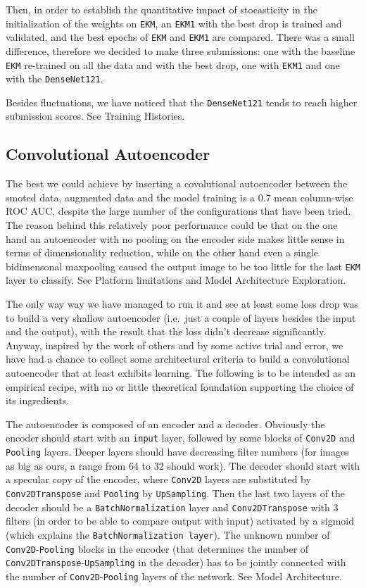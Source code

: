 \documentclass[aps,twocolumn,secnumarabic,nobalancelastpage,amsmath,amssymb,
nofootinbib]{revtex4}
\begin{document}
Then, in order to establish the quantitative impact of stocasticity in
the initialization of the weights on \texttt{EKM}, an \texttt{EKM1} with
the best drop is trained and validated, and the best epochs of
\texttt{EKM} and \texttt{EKM1} are compared. There was a small
difference, therefore we decided to make three submissions: one with the
baseline \texttt{EKM} re-trained on all the data and with the best drop,
one with \texttt{EKM1} and one with the \texttt{DenseNet121}.

Besides fluctuations, we have noticed that the \texttt{DenseNet121}
tends to reach higher submission scores. See
Training Histories.

\subsection{Convolutional Autoencoder}\label{ae}

The best we could achieve by inserting a covolutional autoencoder
between the smoted data, augmented data and the model training is a
\(0.7\) mean column-wise ROC AUC, despite the large number of the
configurations that have been tried. The reason behind this relatively
poor performance could be that on the one hand an autoencoder with no
pooling on the encoder side makes little sense in terms of
dimensionality reduction, while on the other hand even a single
bidimensonal maxpooling caused the output image to be too little for the
last \texttt{EKM} layer to classify. See Platform limitations and Model Architecture Exploration.

The only way way we have managed to run it and see at least some loss
drop was to build a very shallow autoencoder (i.e.~just a couple of
layers besides the input and the output), with the result that the loss
didn't decrease significantly. Anyway, inspired by the work of others
and by some active trial and error, we have had a chance to collect some
architectural criteria to build a convolutional autoencoder that at
least exhibits learning. The following is to be intended as an empirical
recipe, with no or little theoretical foundation supporting the choice
of its ingredients.

The autoencoder is composed of an encoder and a decoder. Obviously the
encoder should start with an \texttt{input} layer, followed by some
blocks of \texttt{Conv2D} and \texttt{Pooling} layers. Deeper layers
should have decreasing filter numbers (for images as big as ours, a
range from 64 to 32 should work). The decoder should start with a
specular copy of the encoder, where \texttt{Conv2D} layers are
substituted by \texttt{Conv2DTranspose} and \texttt{Pooling} by
\texttt{UpSampling}. Then the last two layers of the decoder should be a
\texttt{BatchNormalization} layer and \texttt{Conv2DTranspose} with 3
filters (in order to be able to compare output with input) activated by
a sigmoid (which explains the \texttt{BatchNormalization\ layer}). The
unknown number of \texttt{Conv2D}-\texttt{Pooling} blocks in the encoder
(that determines the number of
\texttt{Conv2DTranspose}-\texttt{UpSampling} in the decoder) has to be
jointly connected with the number of \texttt{Conv2D}-\texttt{Pooling}
layers of the network. See Model
	Architecture.
\end{document}
